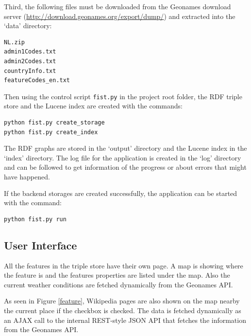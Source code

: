 \documentclass[a4paper,12pt]{article}
\begin{document}
\noindent Third, the following files must be downloaded from the
Geonames download server
(\url{http://download.geonames.org/export/dump/}) and extracted into
the `data' directory:

\begin{verbatim}
NL.zip
admin1Codes.txt
admin2Codes.txt
countryInfo.txt
featureCodes_en.txt
\end{verbatim}

\noindent Then using the control script \texttt{fist.py} in the
project root folder, the RDF triple store and the Lucene index are
created with the commands:

\begin{verbatim}
python fist.py create_storage
python fist.py create_index
\end{verbatim}

\noindent The RDF graphs are stored in the `output' directory and the
Lucene index in the `index' directory. The log file for the
application is created in the `log' directory and can be followed to
get information of the progress or about errors that might have
happened.

If the backend storages are created successfully, the application can
be started with the command:

\begin{verbatim}
python fist.py run
\end{verbatim}

\subsection{User Interface}

All the features in the triple store have their own page. A map is
showing where the feature is and the features properties are listed
under the map. Also the current weather conditions are fetched
dynamically from the Geonames API.

As seen in Figure \ref{feature}, Wikipedia pages are also shown on the
map nearby the current place if the checkbox is checked. The data is
fetched dynamically as an AJAX call to the internal REST-style JSON
API that fetches the information from the Geonames API.
\end{document}

